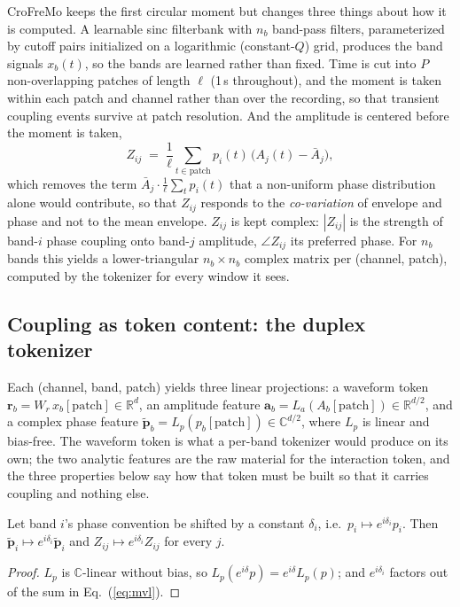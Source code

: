 CroFreMo keeps the first circular moment but changes three things about how
it is computed. A learnable sinc filterbank \citep{ravanelli2018sincnet}
with $n_b$ band-pass filters, parameterized by cutoff pairs initialized on
a logarithmic (constant-$Q$) grid, produces the band signals $x_b(t)$, so
the bands are learned rather than fixed. Time is cut into $P$
non-overlapping patches of length $\ell$ (1\,s throughout), and the moment is
taken within each patch and channel rather than over the recording, so
that transient coupling events survive at patch resolution. And the
amplitude is centered before the moment is taken,
\begin{equation}
Z_{ij} \;=\; \frac{1}{\ell}\sum_{t \in \text{patch}}
p_i(t)\,\bigl(A_j(t) - \bar A_j\bigr),
\label{eq:mvl}
\end{equation}
which removes the term $\bar A_j \cdot \frac{1}{\ell}\sum_t p_i(t)$ that a
non-uniform phase distribution alone would contribute, so that $Z_{ij}$
responds to the \emph{co-variation} of envelope and phase and not to
the mean envelope. $Z_{ij}$ is kept complex: $|Z_{ij}|$ is the strength of
band-$i$ phase coupling onto band-$j$ amplitude, $\angle Z_{ij}$ its
preferred phase. For $n_b$ bands this yields a lower-triangular
$n_b \times n_b$ complex matrix per (channel, patch), computed by the
tokenizer for every window it sees.

\subsection{Coupling as token content: the duplex tokenizer}
\label{sec:tokenizer}

Each (channel, band, patch) yields three linear projections: a waveform
token $\mathbf{r}_b = W_r\,x_b[\text{patch}] \in \mathbb{R}^d$, an
amplitude feature
$\mathbf{a}_b = L_a(A_b[\text{patch}]) \in \mathbb{R}^{d/2}$, and a complex
phase feature
$\tilde{\mathbf{p}}_b = L_p(p_b[\text{patch}]) \in \mathbb{C}^{d/2}$, where
$L_p$ is linear and bias-free. The waveform token is what a per-band
tokenizer would produce on its own; the two analytic features are the raw
material for the interaction token, and the three properties below say how
that token must be built so that it carries coupling and nothing else.

\begin{proposition}
\label{prop:equivariance}
Let band $i$'s phase convention be shifted by a constant $\delta_i$, i.e.\
$p_i \mapsto e^{i\delta_i} p_i$. Then $\tilde{\mathbf{p}}_i \mapsto
e^{i\delta_i}\tilde{\mathbf{p}}_i$ and $Z_{ij} \mapsto e^{i\delta_i} Z_{ij}$
for every $j$.
\end{proposition}
\begin{proof}
$L_p$ is $\mathbb{C}$-linear without bias, so $L_p(e^{i\delta}p) =
e^{i\delta}L_p(p)$; and $e^{i\delta_i}$ factors out of the sum in
Eq.~(\ref{eq:mvl}).
\end{proof}

